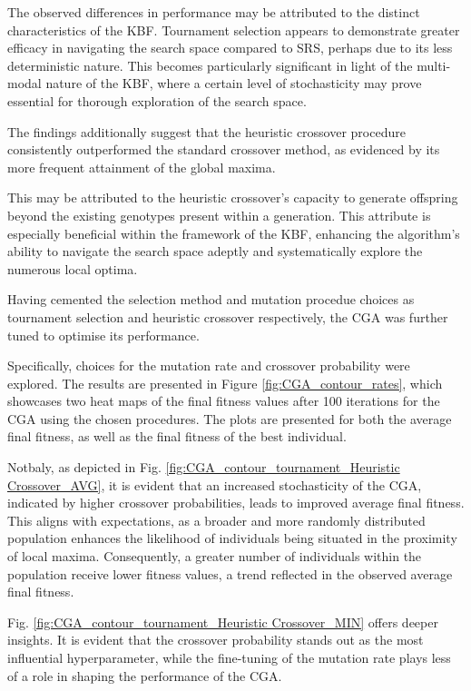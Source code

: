 \documentclass[10pt]{article}
\begin{document}
\begin{multicols}{2}
The observed differences in performance may be attributed to the distinct characteristics of the KBF. Tournament selection appears to demonstrate greater efficacy in navigating the search space compared to SRS, perhaps due to its less deterministic nature. This becomes particularly significant in light of the multi-modal nature of the KBF, where a certain level of stochasticity may prove essential for thorough exploration of the search space.

The findings additionally suggest that the heuristic crossover procedure consistently outperformed the standard crossover method, as evidenced by its more frequent attainment of the global maxima. 

This may be attributed to the heuristic crossover's capacity to generate offspring beyond the existing genotypes present within a generation. This attribute is especially beneficial within the framework of the KBF, enhancing the algorithm's ability to navigate the search space adeptly and systematically explore the numerous local optima.

Having cemented the selection method and mutation procedue choices as tournament selection and heuristic crossover respectively, the CGA was further tuned to optimise its performance. 

Specifically, choices for the mutation rate and crossover probability were explored. The results are presented in Figure \ref{fig:CGA_contour_rates}, which showcases two heat maps of the final fitness values after 100 iterations for the CGA using the chosen procedures. The plots are presented for both the average final fitness, as well as the final fitness of the best individual.

Notbaly, as depicted in Fig. \ref{fig:CGA_contour_tournament_Heuristic Crossover_AVG}, it is evident that an increased stochasticity of the CGA, indicated by higher crossover probabilities, leads to improved average final fitness. This aligns with expectations, as a broader and more randomly distributed population enhances the likelihood of individuals being situated in the proximity of local maxima. Consequently, a greater number of individuals within the population receive lower fitness values, a trend reflected in the observed average final fitness.

Fig. \ref{fig:CGA_contour_tournament_Heuristic Crossover_MIN} offers deeper insights. It is evident that the crossover probability stands out as the most influential hyperparameter, while the fine-tuning of the mutation rate plays less of a role in shaping the performance of the CGA. 


\end{multicols}
\end{document}
